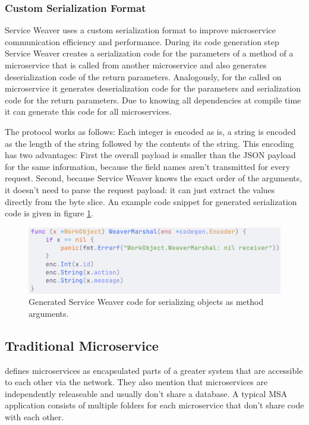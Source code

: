 \documentclass[sigconf,review,9pt]{acmart}
\begin{document}
\subsubsection{Custom Serialization Format}

Service Weaver uses a custom serialization format to improve microservice communication
efficiency and performance.
During its code generation step Service Weaver creates a serialization code for the
parameters of a method of a microservice that is called from another microservice and
also generates deserialization code of the return parameters.
Analogously, for the called on microservice it generates deserialization code for
the parameters and serialization code for the return parameters.
Due to knowing all dependencies at compile time it can generate this code for all
microservices.

The protocol works as follows: Each integer is encoded as is, a string is encoded
as the length of the string followed by the contents of the string.
This encoding has two advantages: First the overall payload is smaller than the
JSON payload for the same information, because the field names aren't transmitted
for every request. Second, because Service Weaver knows the exact order of the arguments,
it doesn't need to parse the request payload: it can just extract the values directly
from the byte slice.
An example code snippet for generated serialization code is given in figure \ref{fig:serialization_code}.

\begin{figure}
	\includegraphics[width=\columnwidth]{serialization_code}
	\caption{Generated Service Weaver code for serializing objects
		as method arguments.}
	\label{fig:serialization_code}
\end{figure}

\subsection{Traditional Microservice}

 defines microservices as encapsulated parts
of a greater system that are accessible to each other via the network.
They also mention that microservices are independently releaseable and usually
don't share a database.
A typical MSA application consists of multiple folders for each microservice
that don't share code with each other.
\end{document}
